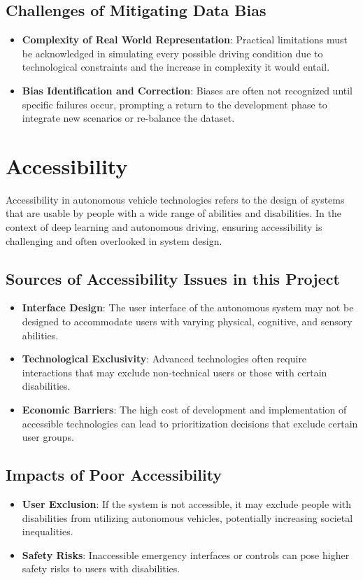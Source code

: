 \documentclass[10pt,twocolumn]{article}
\begin{document}
\subsection{Challenges of Mitigating Data Bias}
\begin{itemize}
    \item \textbf{Complexity of Real World Representation}: Practical limitations must be acknowledged in simulating every possible driving condition due to technological constraints and the increase in complexity it would entail.
    \item \textbf{Bias Identification and Correction}: Biases are often not recognized until specific failures occur, prompting a return to the development phase to integrate new scenarios or re-balance the dataset.
\end{itemize}

\section{Accessibility}
    Accessibility in autonomous vehicle technologies refers to the design of systems that are usable by people with a wide range of abilities and disabilities. In the context of deep learning and autonomous driving, ensuring accessibility is challenging and often overlooked in system design\cite{AccessibilityInAutonomousVehicles}.

\subsection{Sources of Accessibility Issues in this Project}
    \begin{itemize}
        \item \textbf{Interface Design}: The user interface of the autonomous system may not be designed to accommodate users with varying physical, cognitive, and sensory abilities.
        \item \textbf{Technological Exclusivity}: Advanced technologies often require interactions that may exclude non-technical users or those with certain disabilities.
        \item \textbf{Economic Barriers}: The high cost of development and implementation of accessible technologies can lead to prioritization decisions that exclude certain user groups.
    \end{itemize}

\subsection{Impacts of Poor Accessibility}
    \begin{itemize}
        \item \textbf{User Exclusion}: If the system is not accessible, it may exclude people with disabilities from utilizing autonomous vehicles, potentially increasing societal inequalities.
        \item \textbf{Safety Risks}: Inaccessible emergency interfaces or controls can pose higher safety risks to users with disabilities.
    \end{itemize}
\end{document}

